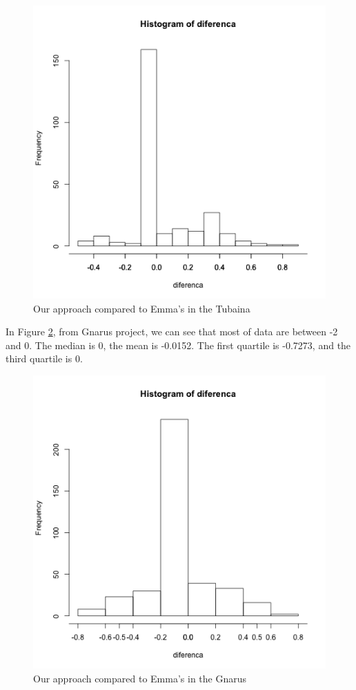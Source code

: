 \documentclass{sig-alternate}
\begin{document}
\begin{figure}[h!H]
  \centering
  \includegraphics[scale=0.5]{imgs/tubaina-histograma.png}
  \caption{Our approach compared to Emma's in the Tubaina}
  \label{fig:tubaina}
\end{figure}


In Figure \ref{fig:gnarus}, from Gnarus project, we can see that most of data
are between -2 and 0. The median is 0, the mean is -0.0152. The first quartile
is -0.7273, and the third quartile is 0.

\begin{figure}[h!H]
  \centering
  \includegraphics[scale=0.5]{imgs/gnarus-histograma.png}
  \caption{Our approach compared to Emma's in the Gnarus}
  \label{fig:gnarus}
\end{figure}
\end{document}
